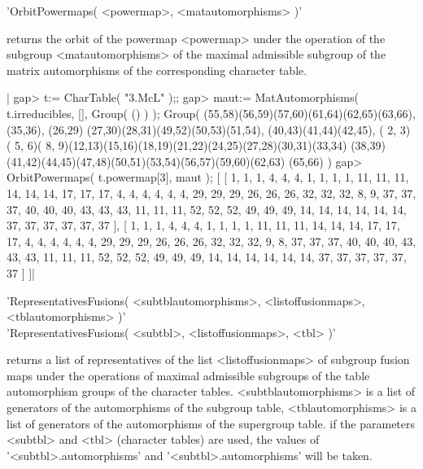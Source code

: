
'OrbitPowermaps( <powermap>, <matautomorphisms> )'

returns the orbit of the powermap <powermap> under the operation of the
subgroup <matautomorphisms> of the maximal admissible subgroup of the matrix
automorphisms of the corresponding character table.

|    gap> t:= CharTable( "3.McL" );;
    gap> maut:= MatAutomorphisms( t.irreducibles, [], Group( () ) );
    Group( (55,58)(56,59)(57,60)(61,64)(62,65)(63,66), (35,36), (26,29)
    (27,30)(28,31)(49,52)(50,53)(51,54), (40,43)(41,44)(42,45), ( 2, 3)
    ( 5, 6)( 8, 9)(12,13)(15,16)(18,19)(21,22)(24,25)(27,28)(30,31)(33,34)
    (38,39)(41,42)(44,45)(47,48)(50,51)(53,54)(56,57)(59,60)(62,63)
    (65,66) )
    gap> OrbitPowermaps( t.powermap[3], maut );
    [ [ 1, 1, 1, 4, 4, 4, 1, 1, 1, 1, 11, 11, 11, 14, 14, 14, 17, 17, 17,
          4, 4, 4, 4, 4, 4, 29, 29, 29, 26, 26, 26, 32, 32, 32, 8, 9, 37,
          37, 37, 40, 40, 40, 43, 43, 43, 11, 11, 11, 52, 52, 52, 49, 49,
          49, 14, 14, 14, 14, 14, 14, 37, 37, 37, 37, 37, 37 ], 
      [ 1, 1, 1, 4, 4, 4, 1, 1, 1, 1, 11, 11, 11, 14, 14, 14, 17, 17, 17,
          4, 4, 4, 4, 4, 4, 29, 29, 29, 26, 26, 26, 32, 32, 32, 9, 8, 37,
          37, 37, 40, 40, 40, 43, 43, 43, 11, 11, 11, 52, 52, 52, 49, 49,
          49, 14, 14, 14, 14, 14, 14, 37, 37, 37, 37, 37, 37 ] ]|


'RepresentativesFusions( <subtblautomorphisms>, <listoffusionmaps>,
                         <tblautomorphisms> )'\\
'RepresentativesFusions( <subtbl>, <listoffusionmaps>, <tbl> )'

returns a list of representatives of the list <listoffusionmaps> of subgroup
fusion maps under the operations of maximal admissible subgroups of the table
automorphism groups of the character tables. <subtblautomorphisms> is a list
of generators of the automorphisms of the subgroup table, <tblautomorphisms>
is a list of generators of the automorphisms of the supergroup table.
if the parameters <subtbl> and <tbl> (character tables) are used, the values
of '<subtbl>.automorphisms' and '<subtbl>.automorphisms' will be
taken.

